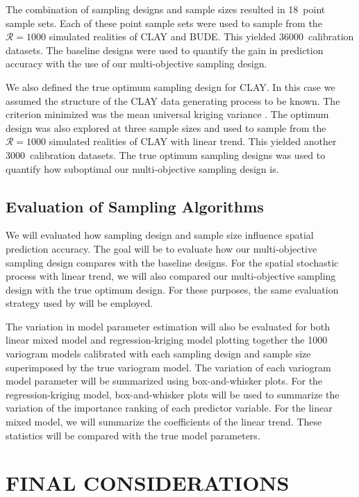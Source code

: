 The combination of sampling designs and sample sizes resulted in 18~point sample sets. Each of these point 
sample sets were used to sample from the $\mathcal{R} = 1000$ simulated realities of CLAY and BUDE. This 
yielded \num{36000}~calibration datasets. The baseline designs were used to quantify the gain in prediction 
accuracy with the use of our multi-objective sampling design.

We also defined the true optimum sampling design for CLAY. In this case we assumed the structure of the CLAY 
data generating process to be known. The criterion minimized was the mean universal kriging variance 
\cite{BrusEtAl2007a}. The optimum design was also explored at three sample sizes and used to sample from the 
$\mathcal{R} = 1000$ simulated realities of CLAY with linear trend. This yielded another 3000~calibration 
datasets. The true optimum sampling designs was used to quantify how suboptimal our multi-objective sampling 
design is.

\subsection{Evaluation of Sampling Algorithms}

We will evaluated how sampling design and sample size influence spatial prediction accuracy. The goal will be 
to evaluate how our multi-objective sampling design compares with the baseline designs. For the spatial 
stochastic process with linear trend, we will also compared our multi-objective sampling design with the true 
optimum design. For these purposes, the same evaluation strategy used by \cite{Samuel-RosaEtAl2016} will be 
employed.

The variation in model parameter estimation will also be evaluated for both linear mixed model and 
regression-kriging model plotting together the 1000 variogram models calibrated with each sampling design and 
sample size superimposed by the true variogram model. The variation of each variogram model parameter will be 
summarized using box-and-whisker plots. For the regression-kriging model, box-and-whisker plots will be used 
to summarize the variation of the importance ranking of each predictor variable. For the linear mixed model, 
we will summarize the coefficients of the linear trend. These statistics will be compared with the true model 
parameters.

\section{FINAL CONSIDERATIONS}

